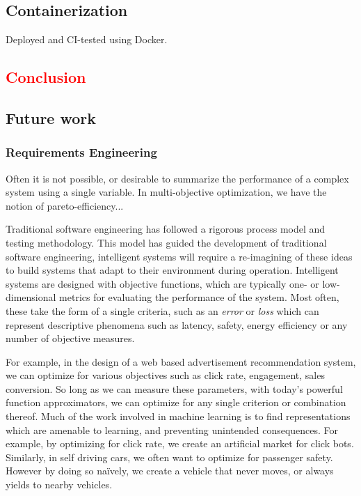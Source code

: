 \documentclass[12pt,initial,twoside,maitrise]{dms}
\newcommand{\rare}[1]{\textcolor{red}{#1}}
\numberwithin{equation}{section}
\numberwithin{table}{chapter}
\numberwithin{figure}{chapter}
\begin{document}
\section{Containerization}

Deployed and CI-tested using Docker.

\rare{\chapter{Conclusion}\label{ch:conclusion}}

\section{Future work}

\subsection{Requirements Engineering}

Often it is not possible, or desirable to summarize the performance of a complex system using a single variable. In multi-objective optimization, we have the notion of pareto-efficiency...

Traditional software engineering has followed a rigorous process model and testing methodology. This model has guided the development of traditional software engineering, intelligent systems will require a re-imagining of these ideas to build systems that adapt to their environment during operation. Intelligent systems are designed with objective functions, which are typically one- or low-dimensional metrics for evaluating the performance of the system. Most often, these take the form of a single criteria, such as an \textit{error} or \textit{loss} which can represent descriptive phenomena such as latency, safety, energy efficiency or any number of objective measures.

For example, in the design of a web based advertisement recommendation system, we can optimize for various objectives such as click rate, engagement, sales conversion. So long as we can measure these parameters, with today's powerful function approximators, we can optimize for any single criterion or combination thereof. Much of the work involved in machine learning is to find representations which are amenable to learning, and preventing unintended consequences. For example, by optimizing for click rate, we create an artificial market for click bots. Similarly, in self driving cars, we often want to optimize for passenger safety. However by doing so na\"ively, we create a vehicle that never moves, or always yields to nearby vehicles.
\end{document}
